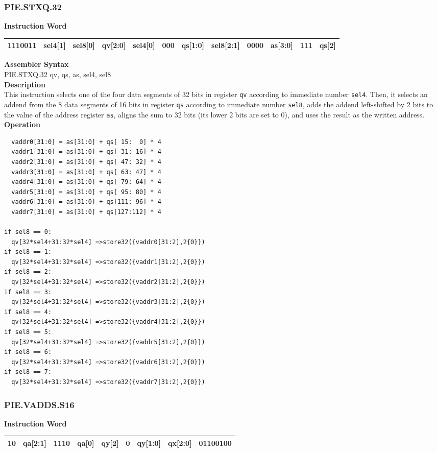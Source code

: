 \newpage
\subsubsection{PIE.STXQ.32}\label{instruction:PIESTXQ32}
\setlength\tabcolsep{6pt}
\textbf{Instruction Word} \\
\begin{tabular}{|c|c|c|c|c|c|c|c|c|c|c|c|}
	\hline
	1110011 & sel4[1] & sel8[0] & qv[2:0] & sel4[0] & 000 & qs[1:0] & sel8[2:1] & 0000 & as[3:0] & 111 & qs[2] \\
	\hline
\end{tabular}

\textbf{Assembler Syntax} \\
PIE.STXQ.32 qv, qs, as, sel4, sel8 \\
\textbf{Description} \\
This instruction selects one of the four data segments of 32 bits in register \lstinline{qv} according to immediate number \lstinline{sel4}. Then, it selects an addend from the 8 data segments of 16 bits in register \lstinline{qs} according to immediate number \lstinline{sel8}, adds the addend left-shifted by 2 bits to the value of the address register \lstinline{as}, aligns the sum to 32 bits (its lower 2 bits are set to 0), and uses the result as the written address.\\
\textbf{Operation}
\begin{lstlisting}
  vaddr0[31:0] = as[31:0] + qs[ 15:  0] * 4
  vaddr1[31:0] = as[31:0] + qs[ 31: 16] * 4
  vaddr2[31:0] = as[31:0] + qs[ 47: 32] * 4
  vaddr3[31:0] = as[31:0] + qs[ 63: 47] * 4
  vaddr4[31:0] = as[31:0] + qs[ 79: 64] * 4
  vaddr5[31:0] = as[31:0] + qs[ 95: 80] * 4
  vaddr6[31:0] = as[31:0] + qs[111: 96] * 4
  vaddr7[31:0] = as[31:0] + qs[127:112] * 4

if sel8 == 0:
  qv[32*sel4+31:32*sel4] =>store32({vaddr0[31:2],2{0}})
if sel8 == 1:
  qv[32*sel4+31:32*sel4] =>store32({vaddr1[31:2],2{0}})
if sel8 == 2:
  qv[32*sel4+31:32*sel4] =>store32({vaddr2[31:2],2{0}})
if sel8 == 3:
  qv[32*sel4+31:32*sel4] =>store32({vaddr3[31:2],2{0}})
if sel8 == 4:
  qv[32*sel4+31:32*sel4] =>store32({vaddr4[31:2],2{0}})
if sel8 == 5:
  qv[32*sel4+31:32*sel4] =>store32({vaddr5[31:2],2{0}})
if sel8 == 6:
  qv[32*sel4+31:32*sel4] =>store32({vaddr6[31:2],2{0}})
if sel8 == 7:
  qv[32*sel4+31:32*sel4] =>store32({vaddr7[31:2],2{0}})
\end{lstlisting}

\newpage
\subsubsection{PIE.VADDS.S16}\label{instruction:PIEVADDSS16}
\setlength\tabcolsep{6pt}
\textbf{Instruction Word} \\
\begin{tabular}{|c|c|c|c|c|c|c|c|c|}
	\hline
	10 & qa[2:1] & 1110 & qa[0] & qy[2] & 0 & qy[1:0] & qx[2:0] & 01100100 \\
	\hline
\end{tabular}

